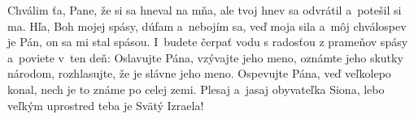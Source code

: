 Chválim ťa, Pane, že si sa hneval na mňa,
ale tvoj hnev sa odvrátil a~potešil si ma.
\versseparator
Hľa, Boh mojej spásy, dúfam a~nebojím sa,
veď moja sila a~môj chválospev je Pán,
on sa mi stal spásou.
\versseparator
 I~budete čerpať vodu s radosťou
z prameňov spásy
\versseparator
a~poviete v~ten deň:
Oslavujte Pána, vzývajte jeho meno,
oznámte jeho skutky národom,
rozhlasujte, že je slávne jeho meno.
\versseparator
Ospevujte Pána, veď veľkolepo konal,
nech je to známe po celej zemi.
\versseparator
Plesaj a~jasaj obyvateľka Siona,
lebo veľkým uprostred teba je Svätý Izraela!
